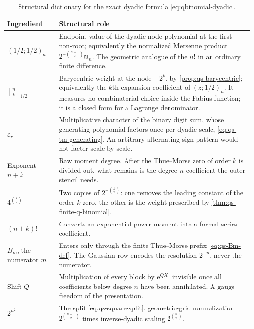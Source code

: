 \documentclass[11pt,oneside]{article}
\theoremstyle{definition}
\theoremstyle{remark}
\newcommand{\e}{\mathrm e}
\newcommand{\qbinom}[3]{\genfrac{[}{]}{0pt}{}{#1}{#2}_{#3}}
\begin{document}
\begin{table}[htbp]
\centering
\caption{Structural dictionary for the exact dyadic formula \eqref{eq:qbinomial-dyadic}.}
\label{tab:qs-roles}
\begin{tabularx}{\textwidth}{@{}>{\raggedright\arraybackslash}p{}X@{}}
\toprule
Ingredient & Structural role\\
\midrule
$(1/2;1/2)_n$
 & Endpoint value of the dyadic node polynomial at the first non-root; equivalently the
   normalized Mersenne product $2^{-\binom{n+1}2}\mathfrak m_n$.  The geometric analogue of
   the $n!$ in an ordinary finite difference.\\
$\qbinom nk{1/2}$
 & Barycentric weight at the node $-2^k$, by \cref{prop:qs-barycentric}; equivalently the
   $k$th expansion coefficient of $(z;1/2)_n$.  It measures no combinatorial choice inside
   the Fabius function; it is a closed form for a Lagrange denominator.\\
$\varepsilon_r$
 & Multiplicative character of the binary digit sum, whose generating polynomial factors once
   per dyadic scale, \eqref{eq:qs-tm-generating}.  An arbitrary alternating sign pattern would
   not factor scale by scale.\\
Exponent $n+k$
 & Raw moment degree.  After the Thue--Morse zero of order $k$ is divided out, what remains is
   the degree-$n$ coefficient the outer stencil needs.\\
$4^{\binom k2}$
 & Two copies of $2^{-\binom k2}$: one removes the leading constant of the order-$k$ zero, the
   other is the weight prescribed by \cref{thm:qs-finite-q-binomial}.\\
$(n+k)!$
 & Converts an exponential power moment into a formal-series coefficient.\\
$B_m$, the numerator $m$
 & Enters only through the finite Thue--Morse prefix \eqref{eq:qs-Bm-def}.  The Gaussian row
   encodes the resolution $2^{-n}$, never the numerator.\\
Shift $Q$
 & Multiplication of every block by $\e^{QX}$; invisible once all coefficients below degree
   $n$ have been annihilated.  A gauge freedom of the presentation.\\
$2^{n^2}$
 & The split \eqref{eq:qs-square-split}: geometric-grid normalization
   $2^{\binom{n+1}2}$ times inverse-dyadic scaling $2^{\binom n2}$.\\
\bottomrule
\end{tabularx}
\end{table}
\end{document}
